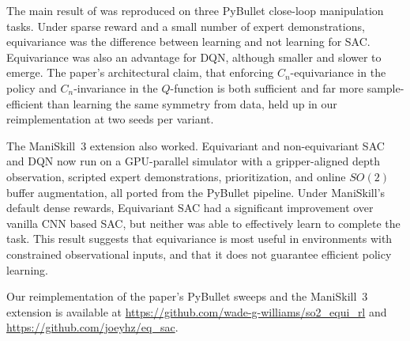 \documentclass[letterpaper]{article}
\begin{document}
The main result of \citet{wang2022so2} was reproduced on three PyBullet close-loop manipulation tasks. Under sparse reward and a small number of expert demonstrations, equivariance was the difference between learning and not learning for SAC. Equivariance was also an advantage for DQN, although smaller and slower to emerge. The paper's architectural claim, that enforcing $C_n$-equivariance in the policy and $C_n$-invariance in the $Q$-function is both sufficient and far more sample-efficient than learning the same symmetry from data, held up in our reimplementation at two seeds per variant.

The ManiSkill~3 extension also worked. Equivariant and non-equivariant SAC and DQN now run on a GPU-parallel simulator with a gripper-aligned depth observation, scripted expert demonstrations, prioritization, and online $SO(2)$ buffer augmentation, all ported from the PyBullet pipeline. Under ManiSkill's default dense rewards, Equivariant SAC had a significant improvement over vanilla CNN based SAC, but neither was able to effectively learn to complete the task. This result suggests that equivariance is most useful in environments with constrained observational inputs, and that it does not guarantee efficient policy learning.

Our reimplementation of the paper's PyBullet sweeps and the ManiSkill~3 extension is available at \url{https://github.com/wade-g-williams/so2_equi_rl} and \url{https://github.com/joeyhz/eq_sac}.


\end{document}
